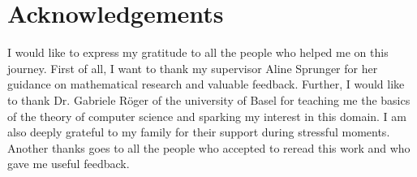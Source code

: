 \chapter*{Acknowledgements}

I would like to express my gratitude to all the people who helped me on this journey.
First of all, I want to thank my supervisor Aline Sprunger for her guidance on mathematical research and valuable feedback.
Further, I would like to thank Dr. Gabriele Röger of the university of Basel for teaching me the basics of the theory of computer science and sparking my interest in this domain.
I am also deeply grateful to my family for their support during stressful moments.
Another thanks goes to all the people who accepted to reread this work and who gave me useful feedback.